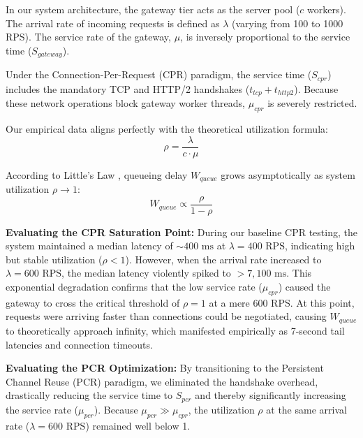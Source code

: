 \documentclass{ieeeaccess}
\begin{document}
In our system architecture, the gateway tier acts as the server pool ($c$ workers). The arrival rate of incoming requests is defined as $\lambda$ (varying from 100 to 1000 RPS). The service rate of the gateway, $\mu$, is inversely proportional to the service time ($S_{gateway}$). 

Under the Connection-Per-Request (CPR) paradigm, the service time ($S_{cpr}$) includes the mandatory TCP and HTTP/2 handshakes ($t_{tcp} + t_{http2}$). Because these network operations block gateway worker threads, $\mu_{cpr}$ is severely restricted. 

Our empirical data aligns perfectly with the theoretical utilization formula: 
$$
\rho = \frac{\lambda}{c \cdot \mu}
$$

According to Little's Law \cite{little2011or}, queueing delay $W_{queue}$ grows asymptotically as system utilization $\rho \to 1$:
$$
W_{queue} \propto \frac{\rho}{1 - \rho}
$$

\textbf{Evaluating the CPR Saturation Point:}
During our baseline CPR testing, the system maintained a median latency of $\sim 400 \text{ ms}$ at $\lambda = 400 \text{ RPS}$, indicating high but stable utilization ($\rho < 1$). However, when the arrival rate increased to $\lambda = 600 \text{ RPS}$, the median latency violently spiked to $> 7,100 \text{ ms}$. This exponential degradation confirms that the low service rate ($\mu_{cpr}$) caused the gateway to cross the critical threshold of $\rho = 1$ at a mere 600 RPS. At this point, requests were arriving faster than connections could be negotiated, causing $W_{queue}$ to theoretically approach infinity, which manifested empirically as 7-second tail latencies and connection timeouts.

\textbf{Evaluating the PCR Optimization:}
By transitioning to the Persistent Channel Reuse (PCR) paradigm, we eliminated the handshake overhead, drastically reducing the service time to $S_{pcr}$ and thereby significantly increasing the service rate ($\mu_{pcr}$). Because $\mu_{pcr} \gg \mu_{cpr}$, the utilization $\rho$ at the same arrival rate ($\lambda = 600 \text{ RPS}$) remained well below 1. 
\end{document}
